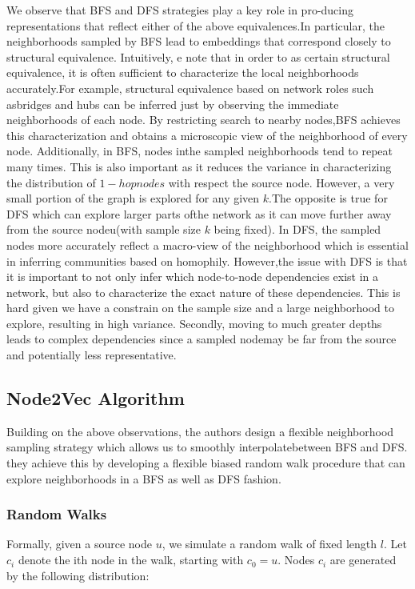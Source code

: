 \documentclass[12pt,a4paper]{article}
\begin{document}
We observe that BFS and DFS strategies play a key role in pro-ducing representations that reflect either of the above equivalences.In particular, the neighborhoods sampled by BFS lead to embeddings that correspond closely to structural equivalence. Intuitively, e note that in order to as certain structural equivalence,  it is often  sufficient  to  characterize  the  local  neighborhoods  accurately.For example, structural equivalence based on network roles such asbridges and hubs can be inferred just by observing the immediate neighborhoods of each node. By restricting search to nearby nodes,BFS achieves this characterization and obtains a microscopic view of the neighborhood of every node. Additionally, in BFS, nodes inthe sampled neighborhoods tend to repeat many times. This is also important as it reduces the variance in characterizing the distribution of $1-hop nodes$ with respect the source node. However, a very small portion of the graph is explored for any given $k$.The opposite is true for DFS which can explore larger parts ofthe network as it can move further away from the source nodeu(with sample size $k$ being fixed). In DFS, the sampled nodes more accurately reflect a macro-view of the neighborhood which is essential  in  inferring  communities  based  on  homophily.   However,the issue with DFS is that it is important to not only infer which node-to-node dependencies exist in a network, but also to characterize the exact nature of these dependencies.  This is hard given we have a constrain on the sample size and a large neighborhood to explore, resulting in high variance.  Secondly, moving to much greater depths leads to complex dependencies since a sampled nodemay be far from the source and potentially less representative.

\subsection*{Node2Vec Algorithm}

Building on the above observations, the authors design a flexible neighborhood sampling strategy which allows us to smoothly interpolatebetween BFS and DFS. they achieve this by developing a flexible biased random walk procedure that can explore neighborhoods in a BFS as well as DFS fashion.

\subsubsection*{Random Walks}
Formally, given a source node $u$, we simulate a random walk of fixed length $l$. Let $c_{i}$ denote the ith node in the walk, starting with $c_{0}=u$. Nodes $c_{i}$ are generated by the following distribution:
\end{document}
